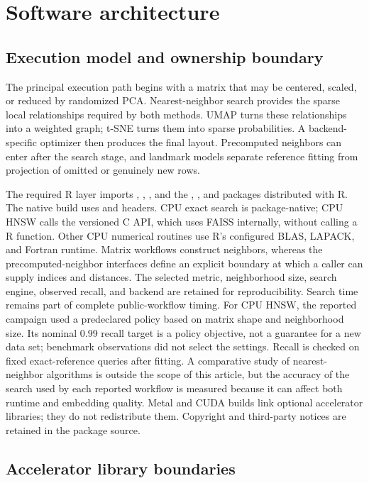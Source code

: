 \documentclass[article]{jss}
\begin{document}
\section{Software architecture}

\subsection{Execution model and ownership boundary}

The principal execution path begins with a matrix that may be centered,
scaled, or reduced by randomized PCA. Nearest-neighbor search
provides the sparse local relationships required by both methods. UMAP turns
these relationships into a weighted graph; t-SNE turns them into sparse
probabilities. A backend-specific optimizer then produces the final layout.
Precomputed neighbors can enter after the search stage, and landmark models
separate reference fitting from projection of omitted or genuinely new rows.

The required R layer imports , , , and
the , , and  packages distributed with
R. The native build uses  and  headers. CPU exact
search is package-native; CPU HNSW calls the versioned  C API,
which uses FAISS internally, without calling a  R function.
Other CPU numerical routines use R's configured BLAS, LAPACK, and Fortran
runtime. Matrix workflows construct neighbors, whereas the precomputed-neighbor
interfaces define an explicit boundary at which a caller can supply indices
and distances. The selected metric, neighborhood size, search engine,
observed recall, and backend are retained for reproducibility. Search time
remains part of complete public-workflow timing.
For CPU HNSW, the reported campaign used a predeclared policy based on
matrix shape and neighborhood size. Its nominal 0.99 recall target is a
policy objective, not a guarantee for a new data set; benchmark observations
did not select the settings. Recall is checked on fixed exact-reference
queries after fitting.
A comparative study of nearest-neighbor algorithms is outside the scope of
this article, but the accuracy of the search used by each reported workflow is
measured because it can affect both runtime and embedding quality. Metal and
CUDA builds link optional accelerator libraries; they do
not redistribute them. Copyright and third-party notices are retained in the
package source.

\subsection{Accelerator library boundaries}
\end{document}
